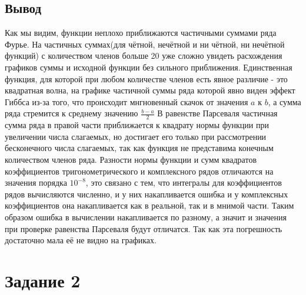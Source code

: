 \documentclass[a4paper, 12pt]{article}
\begin{document}
\subsection{Вывод}
Как мы видим, функции неплохо приближаются частичными суммами ряда Фурье. На частичных суммах(для чётной, нечётной и ни чётной, ни нечётной функций) с количеством членов больше 20 уже сложно увидеть расхождения графиков суммы и исходной функции без сильного приближения.
Единственная функция, для которой при любом количестве членов есть явное различие - это квадратная волна, на графике частичной суммы ряда которой явно виден эффект Гиббса из-за того, что происходит мнгновенный скачок от значения \(a\) к \(b\), а сумма ряда стремится к среднему значению \(\frac{b-a}{2}\)
\newline
\qquad В равенстве Парсеваля частичная сумма ряда в правой части приближается к квадрату нормы функции при увеличении числа слагаемых, но достигает его только при рассмотрении бесконечного числа слагаемых, так как функция не представима конечным количеством членов ряда.
Разности нормы функции и сумм квадратов коэффициентов тригонометрического и комплексного рядов
отличаются на значения порядка \(10^{-8}\), это связано с тем, что интегралы для коэффициентов
рядов вычисляются численно, и у них накапливается ошибка и у комплексных коэффициентов она накапливается
как в реальной, так и в мнимой части. Таким образом ошибка в вычислении накапливается по разному,
а значит и значения при проверке равенства Парсеваля будут отличатся. Так как эта погрешность достаточно мала её не видно на графиках.

\newpage
\section{Задание 2}
\end{document}

